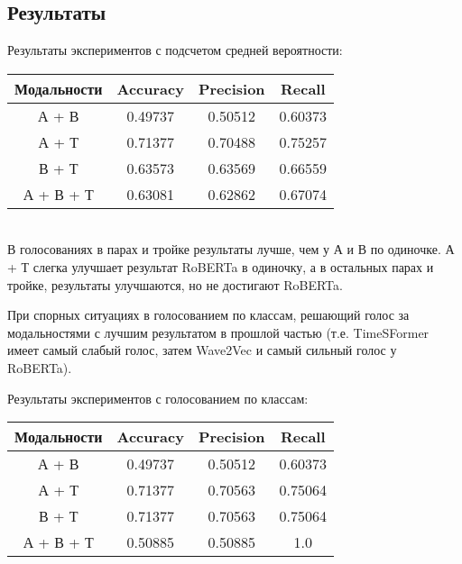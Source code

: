 \documentclass[PMI,VKR]{HSEUniversity}
\begin{document}
\subsection{Результаты}

Результаты экспериментов с подсчетом средней вероятности: \\

\begin{center}
    \begin{tabular}{ |c||c|c|c| }
        \hline
        Модальности & Accuracy & Precision & Recall  \\
        \hline
        А + В       & 0.49737  & 0.50512   & 0.60373 \\
        А + Т       & 0.71377  & 0.70488   & 0.75257 \\
        В + Т       & 0.63573  & 0.63569   & 0.66559 \\
        А + В + Т   & 0.63081  & 0.62862   & 0.67074 \\
        \hline
    \end{tabular}
\end{center} \\

В голосованиях в парах и тройке результаты лучше, чем у А и В по одиночке.
А + Т слегка улучшает результат RoBERTa в одиночку, а в остальных парах и тройке, результаты улучшаются, но не достигают RoBERTa.


При спорных ситуациях в голосованием по классам, решающий голос за модальностями с лучшим результатом в прошлой частью (т.е. TimeSFormer имеет самый слабый голос, затем Wave2Vec и самый сильный голос у RoBERTa).

Результаты экспериментов с голосованием по классам: \\

\begin{center}
    \begin{tabular}{ |c||c|c|c|}
        \hline
        Модальности & Accuracy & Precision & Recall  \\
        \hline
        А + В       & 0.49737  & 0.50512   & 0.60373 \\
        А + Т       & 0.71377  & 0.70563   & 0.75064 \\
        В + Т       & 0.71377  & 0.70563   & 0.75064 \\
        А + В + Т   & 0.50885  & 0.50885   & 1.0     \\
        \hline
    \end{tabular}
\end{center} \\
\end{document}
